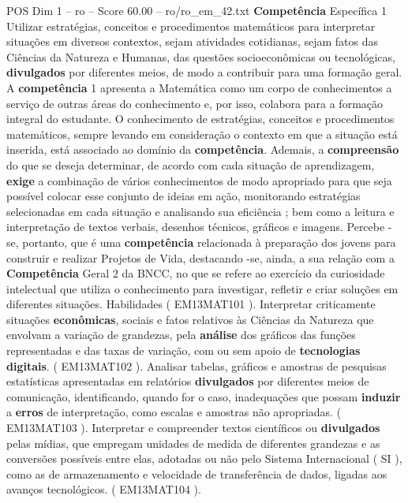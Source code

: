 \begin{textsample}{POS Dim 1 – ro – Score 60.00 – ro/ro\_em\_42.txt}  \label{ex:f1_pos_134}
\textbf{Competência} Específica 1 Utilizar estratégias, conceitos e procedimentos matemáticos para interpretar situações em diversos contextos, sejam atividades cotidianas, sejam fatos das Ciências da Natureza e Humanas, das questões socioeconômicas ou tecnológicas, \textbf{divulgados} por diferentes meios, de modo a contribuir para uma formação geral.
A \textbf{competência} 1 apresenta a Matemática como um corpo de conhecimentos a serviço de outras áreas do conhecimento e, por isso, colabora para a formação integral do estudante.
O conhecimento de estratégias, conceitos e procedimentos matemáticos, sempre levando em consideração o contexto em que a situação está inserida, está associado ao domínio da \textbf{competência}.
Ademais, a \textbf{compreensão} do que se deseja determinar, de acordo com cada situação de aprendizagem, \textbf{exige} a combinação de vários conhecimentos de modo apropriado para que seja possível colocar esse conjunto de ideias em ação, monitorando estratégias selecionadas em cada situação e analisando sua eficiência ; bem como a leitura e interpretação de textos verbais, desenhos técnicos, gráficos e imagens.
Percebe -se, portanto, que é uma \textbf{competência} relacionada à preparação dos jovens para construir e realizar Projetos de Vida, destacando -se, ainda, a sua relação com a \textbf{Competência} Geral 2 da BNCC, no que se refere ao exercício da curiosidade intelectual que utiliza o conhecimento para investigar, refletir e criar soluções em diferentes situações.
Habilidades ( EM13MAT101 ).
Interpretar criticamente situações \textbf{econômicas}, sociais e fatos relativos às Ciências da Natureza que envolvam a variação de grandezas, pela \textbf{análise} dos gráficos das funções representadas e das taxas de variação, com ou sem apoio de \textbf{tecnologias} \textbf{digitais}. ( EM13MAT102 ).
Analisar tabelas, gráficos e amostras de pesquisas estatísticas apresentadas em relatórios \textbf{divulgados} por diferentes meios de comunicação, identificando, quando for o caso, inadequações que possam \textbf{induzir} a \textbf{erros} de interpretação, como escalas e amostras não apropriadas. ( EM13MAT103 ).
Interpretar e compreender textos científicos ou \textbf{divulgados} pelas mídias, que empregam unidades de medida de diferentes grandezas e as conversões possíveis entre elas, adotadas ou não pelo Sistema Internacional ( SI ), como as de armazenamento e velocidade de transferência de dados, ligadas aos avanços tecnológicos. ( EM13MAT104 ).

\end{textsample}
